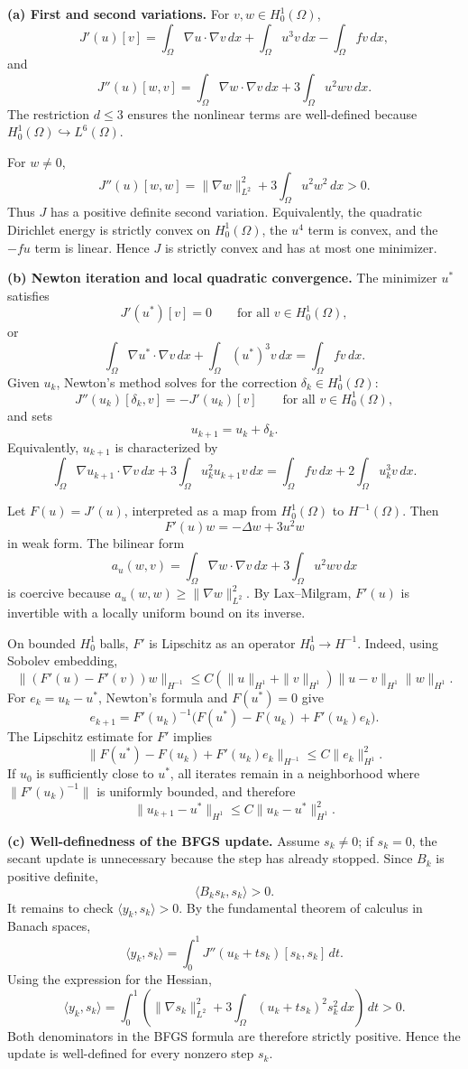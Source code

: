 \begin{solution}
\textbf{(a) First and second variations.}
For $v,w\in H_0^1(\Omega)$,
\[
J'(u)[v]=\int_\Omega \nabla u\cdot \nabla v\,dx+\int_\Omega u^3v\,dx-\int_\Omega fv\,dx,
\]
and
\[
J''(u)[w,v]=\int_\Omega \nabla w\cdot \nabla v\,dx+3\int_\Omega u^2wv\,dx.
\]
The restriction $d\leq 3$ ensures the nonlinear terms are well-defined because
$H_0^1(\Omega)\hookrightarrow L^6(\Omega)$.

For $w\neq 0$,
\[
J''(u)[w,w]=\|\nabla w\|_{L^2}^2+3\int_\Omega u^2w^2\,dx>0.
\]
Thus $J$ has a positive definite second variation. Equivalently, the quadratic Dirichlet
energy is strictly convex on $H_0^1(\Omega)$, the $u^4$ term is convex, and the $-fu$ term is
linear. Hence $J$ is strictly convex and has at most one minimizer.

\textbf{(b) Newton iteration and local quadratic convergence.}
The minimizer $u^*$ satisfies
\[
J'(u^*)[v]=0\qquad \text{for all }v\in H_0^1(\Omega),
\]
or
\[
\int_\Omega \nabla u^*\cdot \nabla v\,dx+\int_\Omega (u^*)^3v\,dx
=\int_\Omega fv\,dx.
\]
Given $u_k$, Newton's method solves for the correction $\delta_k\in H_0^1(\Omega)$:
\[
J''(u_k)[\delta_k,v]=-J'(u_k)[v]\qquad \text{for all }v\in H_0^1(\Omega),
\]
and sets
\[
u_{k+1}=u_k+\delta_k.
\]
Equivalently, $u_{k+1}$ is characterized by
\[
\int_\Omega \nabla u_{k+1}\cdot \nabla v\,dx
+3\int_\Omega u_k^2u_{k+1}v\,dx
=\int_\Omega fv\,dx+2\int_\Omega u_k^3v\,dx.
\]

Let $F(u)=J'(u)$, interpreted as a map from $H_0^1(\Omega)$ to $H^{-1}(\Omega)$. Then
\[
F'(u)w=-\Delta w+3u^2w
\]
in weak form. The bilinear form
\[
a_u(w,v)=\int_\Omega \nabla w\cdot \nabla v\,dx+3\int_\Omega u^2wv\,dx
\]
is coercive because $a_u(w,w)\geq \|\nabla w\|_{L^2}^2$. By Lax--Milgram, $F'(u)$ is
invertible with a locally uniform bound on its inverse.

On bounded $H_0^1$ balls, $F'$ is Lipschitz as an operator $H_0^1\to H^{-1}$. Indeed,
using Sobolev embedding,
\[
\|(F'(u)-F'(v))w\|_{H^{-1}}
\leq C(\|u\|_{H^1}+\|v\|_{H^1})\|u-v\|_{H^1}\|w\|_{H^1}.
\]
For $e_k=u_k-u^*$, Newton's formula and $F(u^*)=0$ give
\[
e_{k+1}
=F'(u_k)^{-1}\bigl(F(u^*)-F(u_k)+F'(u_k)e_k\bigr).
\]
The Lipschitz estimate for $F'$ implies
\[
\|F(u^*)-F(u_k)+F'(u_k)e_k\|_{H^{-1}}
\leq C\|e_k\|_{H^1}^2.
\]
If $u_0$ is sufficiently close to $u^*$, all iterates remain in a neighborhood where
$\|F'(u_k)^{-1}\|$ is uniformly bounded, and therefore
\[
\|u_{k+1}-u^*\|_{H^1}\leq C\|u_k-u^*\|_{H^1}^2.
\]

\textbf{(c) Well-definedness of the BFGS update.}
Assume $s_k\neq 0$; if $s_k=0$, the secant update is unnecessary because the step has already
stopped. Since $B_k$ is positive definite,
\[
\langle B_ks_k,s_k\rangle>0.
\]
It remains to check $\langle y_k,s_k\rangle>0$. By the fundamental theorem of calculus in
Banach spaces,
\[
\langle y_k,s_k\rangle
=\int_0^1 J''(u_k+ts_k)[s_k,s_k]\,dt.
\]
Using the expression for the Hessian,
\[
\langle y_k,s_k\rangle
=\int_0^1\left(\|\nabla s_k\|_{L^2}^2
+3\int_\Omega (u_k+ts_k)^2s_k^2\,dx\right)\,dt>0.
\]
Both denominators in the BFGS formula are therefore strictly positive. Hence the update is
well-defined for every nonzero step $s_k$.
\end{solution}

